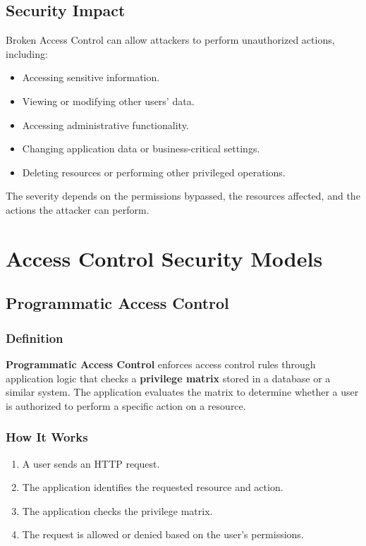 \documentclass[11pt,a4paper]{article}
\begin{document}
\subsection{Security Impact}

Broken Access Control can allow attackers to perform unauthorized actions, including:
\begin{itemize}
    \item Accessing sensitive information.
    \item Viewing or modifying other users' data.
    \item Accessing administrative functionality.
    \item Changing application data or business-critical settings.
    \item Deleting resources or performing other privileged operations.
\end{itemize}

The severity depends on the permissions bypassed, the resources affected, and the actions the attacker can perform.

\newpage
\section{Access Control Security Models}

\subsection{Programmatic Access Control}

\subsubsection{Definition}

\textbf{Programmatic Access Control} enforces access control rules through application logic that checks a \textbf{privilege matrix} stored in a database or a similar system.
The application evaluates the matrix to determine whether a user is authorized to perform a specific action on a resource.

\subsubsection{How It Works}

\begin{enumerate}
    \item A user sends an HTTP request.
    \item The application identifies the requested resource and action.
    \item The application checks the privilege matrix.
    \item The request is allowed or denied based on the user's permissions.
\end{enumerate}
\end{document}
